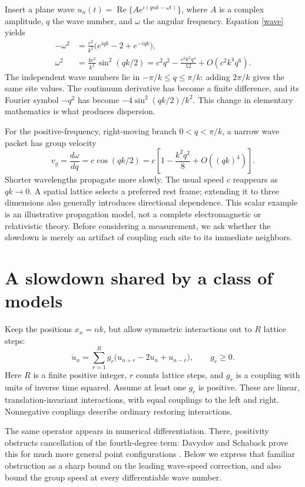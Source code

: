 \documentclass[11pt]{article}
\begin{document}
Insert a plane wave $u_n(t)=\operatorname{Re}\{A e^{i(qnk-\omega t)}\}$, where $A$ is a complex amplitude, $q$ the wave number, and $\omega$ the angular frequency. Equation \eqref{wave} yields
\begin{align}
-\omega^2&=\frac{c^2}{k^2}\bigl(e^{iqk}-2+e^{-iqk}\bigr),\\
\omega^2&=\frac{4c^2}{k^2}\sin^2(qk/2)
=c^2q^2-\frac{c^2k^2q^4}{12}+O(c^2k^4q^6).
\label{dispersion}
\end{align}
The independent wave numbers lie in $-\pi/k\leq q\leq\pi/k$: adding $2\pi/k$ gives the same site values. The continuum derivative has become a finite difference, and its Fourier symbol $-q^2$ has become $-4\sin^2(qk/2)/k^2$. This change in elementary mathematics is what produces dispersion.

For the positive-frequency, right-moving branch $0<q<\pi/k$, a narrow wave packet has group velocity
\begin{equation}\label{velocity}
v_g=\frac{d\omega}{dq}=c\cos(qk/2)
=c\left[1-\frac{k^2q^2}{8}+O((qk)^4)\right].
\end{equation}
Shorter wavelengths propagate more slowly. The usual speed $c$ reappears as $qk\to0$. A spatial lattice selects a preferred rest frame; extending it to three dimensions also generally introduces directional dependence. This scalar example is an illustrative propagation model, not a complete electromagnetic or relativistic theory. Before considering a measurement, we ask whether the slowdown is merely an artifact of coupling each site to its immediate neighbors.

\section{A slowdown shared by a class of models}
Keep the positions $x_n=nk$, but allow symmetric interactions out to $R$ lattice steps:
\begin{equation}\label{generalwave}
\ddot u_n=\sum_{r=1}^{R}g_r
\bigl(u_{n+r}-2u_n+u_{n-r}\bigr),\qquad g_r\geq0.
\end{equation}
Here $R$ is a finite positive integer, $r$ counts lattice steps, and $g_r$ is a coupling with units of inverse time squared. Assume at least one $g_r$ is positive. These are linear, translation-invariant interactions, with equal couplings to the left and right. Nonnegative couplings describe ordinary restoring interactions.

The same operator appears in numerical differentiation. There, positivity obstructs cancellation of the fourth-degree term: Davydov and Schaback prove this for much more general point configurations \cite[\S4.3, Proposition 17]{davydov}. Below we express that familiar obstruction as a sharp bound on the leading wave-speed correction, and also bound the group speed at every differentiable wave number.
\end{document}
